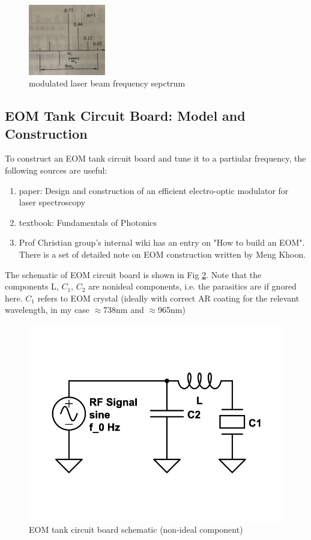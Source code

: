 \documentclass[12pt]{report}
\begin{document}
\begin{figure}[H]
    \centering
    \includegraphics[width=0.3\textwidth]{EOMsidebandTheory.png}
    \caption{modulated laser beam frequency sepctrum}
    \label{fig:EOMsidebandTheory}
\end{figure}

\subsection{EOM Tank Circuit Board: Model and Construction}
To construct an EOM tank circuit board and tune it to a partiular frequency, the following sources are useful: 
\begin{enumerate}
    \item paper: Design and construction of an efficient electro-optic modulator for laser spectroscopy\cite{20MHzEOM}
    \item textbook: Fundamentals of Photonics\cite{fundamentalsOfPhotonics}
    \item Prof Christian group's internal wiki has an entry on "How to build an EOM". There is a set of detailed note on EOM construction written by Meng Khoon. 
\end{enumerate}
The schematic of EOM circuit board is shown in Fig \ref{fig:eom-tank-cirucuit1}. Note that the components L, $C_1$, $C_2$ are nonideal components, i.e. the parasitics are if gnored here.
$C_1$ refers to EOM crystal (ideally with correct AR coating for the relevant wavelength, in my case $\approx$738nm and $\approx$965nm)

\begin{figure}[H]
    \centering
    \includegraphics[width=.5\textwidth]{eom-tank-cirucuit1.png}
    \caption{EOM tank circuit board schematic (non-ideal component)}
    \label{fig:eom-tank-cirucuit1}
\end{figure}
\end{document}
